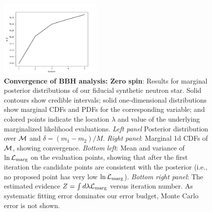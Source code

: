 \documentclass[twocolumn,prd,nofootinbib]{revtex4}
\newcommand\editremark[1]{{\color{red} #1}}
\newcommand{\mc}{{\cal M}}
\begin{document}
\begin{figure}
\includegraphics[width=0.45\textwidth]{figures/bbh_zerospin_lnL_converge.png}
\caption{\label{fig:BBH:MultiIterate}\textbf{Convergence of BBH analysis: Zero spin}: Results for marginal posterior distributions
  of our fiducial synthetic neutron star.  Solid contours show credible intervals; solid one-dimensional distributions
  show marginal CDFs and PDFs for the corresponding variable; and colored points indicate the location $\lambda$ and
  value of the underlying marginalized likelihood evaluations.   
\emph{Left panel } Posterior distribution
  over  $\mc$ and
  $\delta=(m_1-m_2)/M$.    \emph{Right panel}: Marginal 1d CDFs of $\mc$, showing convergence.
\emph{Bottom left}: Mean and variance of  $\ln{\cal L}_{\rm marg}$ on the evaluation points,  showing that after the
first iteration the
candidate points are consistent with the posterior (i.e., no proposed point has very low $\ln {\cal L}_{\rm marg}$).
\emph{Bottom right panel}: The estimated evidence $Z = \int d\lambda {\cal L}_{\rm marg}$ versus iteration number.  As systematic fitting error dominates our
error budget, Monte Carlo error is not shown.
}
\end{figure}
\end{document}
